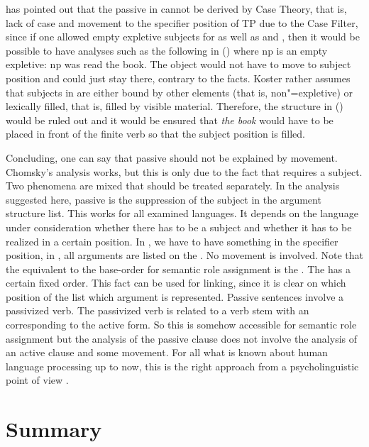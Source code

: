 \citet[]{Koster86a} has pointed out that the passive in  cannot be derived by Case
Theory, that is, lack of case and movement to the specifier position of TP due to the Case Filter, since if one allowed empty expletive subjects for  as well as  and , then it would be possible
to have analyses such as the following in () where np is an empty expletive:
\ea
np was read the book.
\z
The object would not have to move to subject position and could just stay there, contrary to the facts.
Koster rather assumes that subjects in  are either bound by other elements (that is, non"=expletive) or lexically filled, that
is, filled by visible material.
Therefore, the structure in () would be ruled out and it would be ensured that \emph{the book} would have to be placed in front
of the finite verb so that the subject position is filled.

Concluding, one can say that passive should not be explained by movement. Chomsky's analysis works,
but this is only due to the fact that  requires a subject. Two phenomena are mixed that
should be treated separately. In the analysis suggested here, passive is the suppression of the
subject in the argument structure list. This works for all examined languages. It depends on the
language under consideration whether there has to be a subject and whether it has to be realized in
a certain position. In , we have to have something in the specifier position, in , all
arguments are listed on the \compsl. No movement is involved. Note that the equivalent to the
base-order for semantic role assignment is the \argstl. The \argstl has a certain fixed order. This fact
can be used for linking, since it is clear on which position of the list which argument is
represented. Passive sentences involve a passivized verb. The passivized verb is related to a verb
stem with an \argstl corresponding to the active form. So this \argstl is somehow accessible for
semantic role assignment but the analysis of the passive clause does not involve the analysis of an
active clause and some movement. For all what is known about human language processing up to now, this is
the right approach from a psycholinguistic point of view \citep[Section~3.2]{Wasow2021a}. 




\section{Summary}

